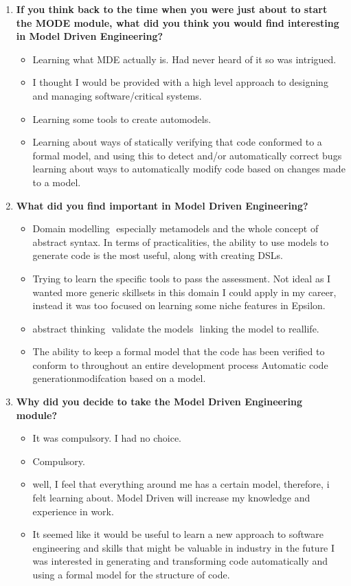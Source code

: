\documentclass[12pt, a4paper]{report}
\begin{document}
\begin{appendices}
\begin{enumerate}
\item  \textbf{If you think back to the time when you were just about to start the MODE module, what did you think you would find interesting in Model ­Driven Engineering?}
\begin{itemize}
\item Learning what MDE actually is. Had never heard of it so was intrigued.
\item I thought I would be provided with a high level approach to designing and managing software/critical systems.
\item Learning some tools to create auto­models.
\item Learning about ways of statically verifying that code conformed to a formal model, and using this to detect and/or automatically correct bugs learning about ways to automatically modify code based on changes made to a model.
\end{itemize}

\item  \textbf{What did you find important in Model­ Driven Engineering?}
\begin{itemize}
\item Domain modelling ­ especially metamodels and the whole concept of abstract syntax. In terms of practicalities, the ability to use models to generate code is the most useful, along with creating DSLs.
\item Trying to learn the specific tools to pass the assessment. Not ideal as I wanted more generic
skillsets in this domain I could apply in my career, instead it was too focused on learning some niche features in Epsilon.
\item abstract thinking ­ validate the models ­ linking the model to real­life.
\item The ability to keep a formal model that the code has been verified to conform to throughout
an entire development process Automatic code generationmodifcation based on a model.
\end{itemize}

\item  \textbf{ Why did you decide to take the Model ­Driven Engineering module?}
\begin{itemize}
\item It was compulsory. I had no choice.
\item Compulsory.
\item well, I feel that everything around me has a certain model, therefore, i felt learning about. Model­ Driven will increase my knowledge and experience in work. 
\item It seemed like it would be useful to learn a new approach to software engineering and skills that might be valuable in industry in the future I was interested in generating and transforming code automatically and using a formal model for the structure of code.
\end{itemize}



\end{enumerate}
\end{appendices}
\end{document}
